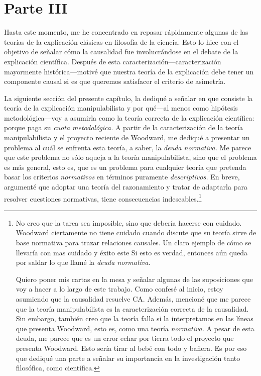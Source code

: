 {{\section{Parte III}\label{s:piii}


\noindent Hasta este momento, me he concentrado en repasar
rápidamente algunas de las teorías de la explicación
clásicas en filosofía de la ciencia. Esto lo hice con el
objetivo de señalar cómo la causalidad fue involucrándose en
el debate de la explicación científica. Después de esta
caracterización---caracterización mayormente
histórica---motivé que nuestra teoría de la explicación
debe tener un componente causal si es que queremos
satisfacer el criterio de asimetría.

La siguiente sección del presente capítulo, la dediqué a
señalar en que consiste la teoría de la explicación
manipulabilista y por qué---al menos como hipótesis
metodológica---voy a asumirla como la teoría correcta de
la explicación científica: porque paga su \emph{cuota
metodológica.} A partir de la caracterización de la teoría
manipulabilista y el proyecto reciente de Woodward, me
dediqué a presentar un problema al cuál se enfrenta esta
teoría, a saber, la \emph{deuda normativa.} Me parece que
este problema no sólo aqueja a la teoría manipulabilista,
sino que el problema es más general, esto es, que es un
problema para cualquier teoría que pretenda basar los
criterios \emph{normativos} en términos puramente
\emph{descriptivos.} En breve, argumenté que adoptar una
teoría del razonamiento y tratar de adaptarla para resolver
cuestiones normativas, tiene consecuencias
indeseables.\footnote{
  No creo que la tarea sea imposible, sino que debería
  hacerse con cuidado. Woodward ciertamente no
  tiene cuidado cuando discute que su teoría sirve de base
  normativa para trazar relaciones causales. Un claro
  ejemplo de cómo se llevaría con mas cuidado y éxito este
Si esto es verdad, entonces aún queda por saldar lo que llamé
la \emph{deuda normativa.}

Quiero poner mis cartas en la mesa y señalar algunas de las
suposiciones que voy a hacer a lo largo de este trabajo.
Como confesé al inicio, estoy asumiendo que la causalidad
resuelve CA. Además, mencioné que me parece que la teoría
manipulabilista es la caracterización correcta de la
causalidad. Sin embargo, también creo que la teoría falla si
la interpretamos en las líneas que presenta Woodward, esto
es, como una teoría \emph{normativa.} A pesar de esta deuda,
me parece que es un error echar por tierra todo el proyecto
que presenta Woodward. Esto sería tirar al bebé con todo y
bañera. Es por eso que dediqué una parte a señalar su
importancia en la investigación tanto filosófica, como
científica.

}}}
